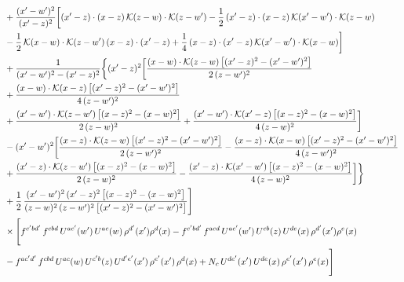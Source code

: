 \documentclass[9pt]{article}
\numberwithin{equation}{section}
\begin{document}
\begin{align}
&+\frac{(x^{\prime}-w^{\prime})^{2}}{(x^{\prime}-z)^{2}}\bigg[(x^{\prime}-z)\cdot(x-z)\,\mathcal{K}(z-w)\cdot\mathcal{K}(z-w^{\prime})-\frac{1}{2}\,(x^{\prime}-z)\cdot(x-z)\,\mathcal{K}(x^{\prime}-w^{\prime})\cdot\mathcal{K}(z-w)\notag \\ & -\frac{1}{2}\,\mathcal{K}(x-w)\cdot\mathcal{K}(z-w^{\prime})\,(x-z)\cdot(x^{\prime}-z)+\frac{1}{4}\,(x-z)\cdot(x^{\prime}-z)\,\mathcal{K}(x^{\prime}-w^{\prime})\cdot\mathcal{K}(x-w)\bigg]\notag\\
&+\frac{1}{(x^{\prime}-w^{\prime})^{2}-(x^{\prime}-z)^{2}}\bigg\{(x^{\prime}-z)^{2}\bigg[\frac{(x-w)\cdot\mathcal{K}(z-w)\,\big[(x^{\prime}-z)^{2}-(x^{\prime}-w^{\prime})^{2}\big]}{2\,(z-w^{\prime})^{2}}\notag\\ &+\frac{(x-w)\cdot\mathcal{K}(x-z)\,\big[(x^{\prime}-z)^{2}-(x^{\prime}-w^{\prime})^{2}\big]}{4\,(z-w^{\prime})^{2}}\notag \\ & +\frac{(x^{\prime}-w^{\prime})\cdot\mathcal{K}(z-w^{\prime})\,\big[(x-z)^{2}-(x-w)^{2}\big]}{2\,(z-w)^{2}}+\frac{(x^{\prime}-w^{\prime})\cdot\mathcal{K}(x^{\prime}-z)\,\big[(x-z)^{2}-(x-w)^{2}\big]}{4\,(z-w)^{2}}\bigg]\notag\\
&-(x^{\prime}-w^{\prime})^{2}\bigg[\frac{(x-z)\cdot\mathcal{K}(z-w)\,\big[(x^{\prime}-z)^{2}-(x^{\prime}-w^{\prime})^{2}\big]}{2\,(z-w^{\prime})^{2}}-\frac{(x-z)\cdot\mathcal{K}(x-w)\,\big[(x^{\prime}-z)^{2}-(x^{\prime}-w^{\prime})^{2}\big]}{4\,(z-w^{\prime})^{2}}\notag \\ & +\frac{(x^{\prime}-z)\cdot\mathcal{K}(z-w^{\prime})\,\big[(x-z)^{2}-(x-w)^{2}\big]}{2\,(z-w)^{2}}-\frac{(x^{\prime}-z)\cdot\mathcal{K}(x^{\prime}-w^{\prime})\,\big[(x-z)^{2}-(x-w)^{2}\big]}{4\,(z-w)^{2}}\bigg]\bigg\}\notag\\
&+\frac{1}{2}\,\frac{(x^{\prime}-w^{\prime})^{2}\,(x^{\prime}-z)^{2}\,\big[(x-z)^{2}-(x-w)^{2}\big]}{(z-w)^{2}\,(z-w^{\prime})^{2}\,\big[(x^{\prime}-z)^{2}-(x^{\prime}-w^{\prime})^{2}\big]}\Bigg]\notag\\
&\times\Bigg[f^{c^{\prime}bd^{\prime}}\,f^{cbd}\, U^{ac^{\prime}}(w^{\prime})\,U^{ac}(w)\,\rho^{d^{\prime}}(x^{\prime})\rho^{d}(x)- f^{c^{\prime}bd^{\prime}}\,f^{acd}\,U^{ac^{\prime}}(w^{\prime})\,U^{cb}(z)\,U^{de}(x)\,\rho^{d^{\prime}}(x^{\prime})\rho^{e}(x) \notag \\ & -f^{ac^{\prime}d^{\prime}}\,f^{cbd}\,U^{ac}(w)\,U^{c^{\prime}b}(z)\,U^{d^{\prime}e^{\prime}}(x^{\prime})\,\rho^{e^{\prime}}(x^{\prime})\,\rho^{d}(x) +N_{c}\,U^{de^{\prime}}(x^{\prime})\,U^{de}(x)\,\rho^{e^{\prime}}(x^{\prime})\,\rho^{e}(x)\Bigg]\\

\end{align}
\end{document}
